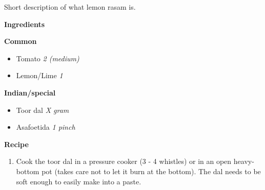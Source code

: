 Short description of what lemon rasam is.

\large{\textbf{Ingredients}}
\begin{multicols}{2}
  \large{\textbf{Common}}
  \begin{itemize}
    \item Tomato \hfill \textit{2 (medium)}
    \item Lemon/Lime \hfill \textit{1}
  \end{itemize}
  \columnbreak
  \large{\textbf{Indian/special}}
  \begin{itemize}
    \item Toor dal \hfill \textit{X gram}
    \item Asafoetida \hfill \textit{1 pinch}
  \end{itemize}
\end{multicols}

\large{\textbf{Recipe}}

\begin{enumerate}
  \item Cook the toor dal in a pressure cooker (3 - 4 whistles) or in an open heavy-bottom pot (takes care not to let it burn at the bottom). The dal needs to be soft enough to easily make into a paste.
\end{enumerate}

